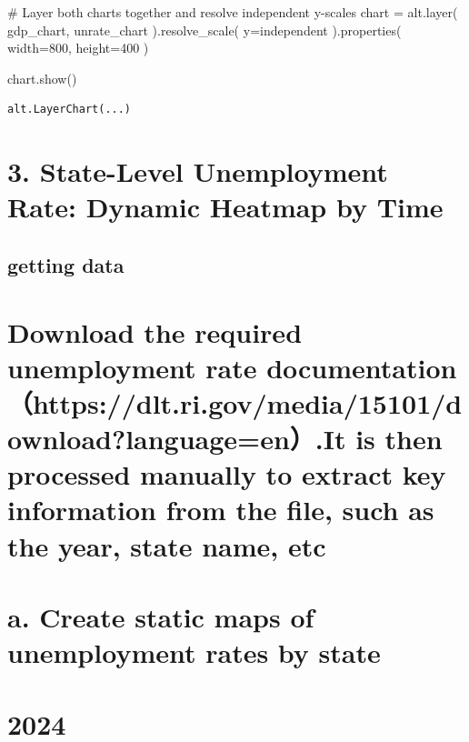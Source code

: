 \documentclass[
  letterpaper,
  DIV=11,
  numbers=noendperiod]{scrartcl}
\newenvironment{Shaded}{\begin{snugshade}}{\end{snugshade}}
\newcommand{\CommentTok}[1]{\textcolor[rgb]{0.37,0.37,0.37}{#1}}
\newcommand{\DecValTok}[1]{\textcolor[rgb]{0.68,0.00,0.00}{#1}}
\newcommand{\NormalTok}[1]{\textcolor[rgb]{0.00,0.23,0.31}{#1}}
\newcommand{\OperatorTok}[1]{\textcolor[rgb]{0.37,0.37,0.37}{#1}}
\newcommand{\StringTok}[1]{\textcolor[rgb]{0.13,0.47,0.30}{#1}}
\begin{document}
\begin{Shaded}
\begin{Highlighting}[]
\CommentTok{\# Layer both charts together and resolve independent y{-}scales}
\NormalTok{chart }\OperatorTok{=}\NormalTok{ alt.layer(}
\NormalTok{    gdp\_chart, unrate\_chart}
\NormalTok{).resolve\_scale(}
\NormalTok{    y}\OperatorTok{=}\StringTok{\textquotesingle{}independent\textquotesingle{}}
\NormalTok{).properties(}
\NormalTok{    width}\OperatorTok{=}\DecValTok{800}\NormalTok{,}
\NormalTok{    height}\OperatorTok{=}\DecValTok{400}
\NormalTok{)}

\NormalTok{chart.show()}
\end{Highlighting}
\end{Shaded}

\begin{verbatim}
alt.LayerChart(...)
\end{verbatim}

\section{3. State-Level Unemployment Rate: Dynamic Heatmap by
Time}\label{state-level-unemployment-rate-dynamic-heatmap-by-time}

\subsection{getting data}\label{getting-data}

\section{Download the required unemployment rate
documentation（https://dlt.ri.gov/media/15101/download?language=en）.It
is then processed manually to extract key information from the file,
such as the year, state name,
etc}\label{download-the-required-unemployment-rate-documentationhttpsdlt.ri.govmedia15101downloadlanguageen.it-is-then-processed-manually-to-extract-key-information-from-the-file-such-as-the-year-state-name-etc}

\section{a. Create static maps of unemployment rates by
state}\label{a.-create-static-maps-of-unemployment-rates-by-state}

\section{2024}\label{section}
\end{document}
